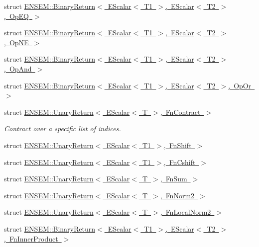 \begin{DoxyCompactItemize}
\item 
struct \mbox{\hyperlink{structENSEM_1_1BinaryReturn_3_01EScalar_3_01T1_01_4_00_01EScalar_3_01T2_01_4_00_01OpEQ_01_4}{E\+N\+S\+E\+M\+::\+Binary\+Return$<$ E\+Scalar$<$ T1 $>$, E\+Scalar$<$ T2 $>$, Op\+E\+Q $>$}}
\item 
struct \mbox{\hyperlink{structENSEM_1_1BinaryReturn_3_01EScalar_3_01T1_01_4_00_01EScalar_3_01T2_01_4_00_01OpNE_01_4}{E\+N\+S\+E\+M\+::\+Binary\+Return$<$ E\+Scalar$<$ T1 $>$, E\+Scalar$<$ T2 $>$, Op\+N\+E $>$}}
\item 
struct \mbox{\hyperlink{structENSEM_1_1BinaryReturn_3_01EScalar_3_01T1_01_4_00_01EScalar_3_01T2_01_4_00_01OpAnd_01_4}{E\+N\+S\+E\+M\+::\+Binary\+Return$<$ E\+Scalar$<$ T1 $>$, E\+Scalar$<$ T2 $>$, Op\+And $>$}}
\item 
struct \mbox{\hyperlink{structENSEM_1_1BinaryReturn_3_01EScalar_3_01T1_01_4_00_01EScalar_3_01T2_01_4_00_01OpOr_01_4}{E\+N\+S\+E\+M\+::\+Binary\+Return$<$ E\+Scalar$<$ T1 $>$, E\+Scalar$<$ T2 $>$, Op\+Or $>$}}
\item 
struct \mbox{\hyperlink{structENSEM_1_1UnaryReturn_3_01EScalar_3_01T_01_4_00_01FnContract_01_4}{E\+N\+S\+E\+M\+::\+Unary\+Return$<$ E\+Scalar$<$ T $>$, Fn\+Contract $>$}}
\begin{DoxyCompactList}\small\item\em Contract over a specific list of indices. \end{DoxyCompactList}\item 
struct \mbox{\hyperlink{structENSEM_1_1UnaryReturn_3_01EScalar_3_01T1_01_4_00_01FnShift_01_4}{E\+N\+S\+E\+M\+::\+Unary\+Return$<$ E\+Scalar$<$ T1 $>$, Fn\+Shift $>$}}
\item 
struct \mbox{\hyperlink{structENSEM_1_1UnaryReturn_3_01EScalar_3_01T1_01_4_00_01FnCshift_01_4}{E\+N\+S\+E\+M\+::\+Unary\+Return$<$ E\+Scalar$<$ T1 $>$, Fn\+Cshift $>$}}
\item 
struct \mbox{\hyperlink{structENSEM_1_1UnaryReturn_3_01EScalar_3_01T_01_4_00_01FnSum_01_4}{E\+N\+S\+E\+M\+::\+Unary\+Return$<$ E\+Scalar$<$ T $>$, Fn\+Sum $>$}}
\item 
struct \mbox{\hyperlink{structENSEM_1_1UnaryReturn_3_01EScalar_3_01T_01_4_00_01FnNorm2_01_4}{E\+N\+S\+E\+M\+::\+Unary\+Return$<$ E\+Scalar$<$ T $>$, Fn\+Norm2 $>$}}
\item 
struct \mbox{\hyperlink{structENSEM_1_1UnaryReturn_3_01EScalar_3_01T_01_4_00_01FnLocalNorm2_01_4}{E\+N\+S\+E\+M\+::\+Unary\+Return$<$ E\+Scalar$<$ T $>$, Fn\+Local\+Norm2 $>$}}
\item 
struct \mbox{\hyperlink{structENSEM_1_1BinaryReturn_3_01EScalar_3_01T1_01_4_00_01EScalar_3_01T2_01_4_00_01FnInnerProduct_01_4}{E\+N\+S\+E\+M\+::\+Binary\+Return$<$ E\+Scalar$<$ T1 $>$, E\+Scalar$<$ T2 $>$, Fn\+Inner\+Product $>$}}

\end{DoxyCompactItemize}

